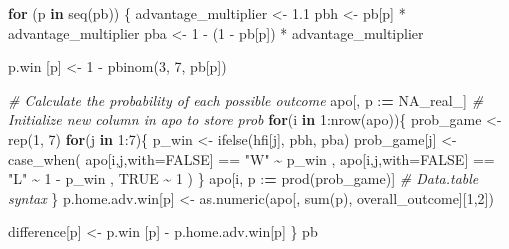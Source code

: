 \documentclass[
]{article}
\newenvironment{Shaded}{\begin{snugshade}}{\end{snugshade}}
\newcommand{\AttributeTok}[1]{\textcolor[rgb]{0.77,0.63,0.00}{#1}}
\newcommand{\CommentTok}[1]{\textcolor[rgb]{0.56,0.35,0.01}{\textit{#1}}}
\newcommand{\ConstantTok}[1]{\textcolor[rgb]{0.00,0.00,0.00}{#1}}
\newcommand{\ControlFlowTok}[1]{\textcolor[rgb]{0.13,0.29,0.53}{\textbf{#1}}}
\newcommand{\DecValTok}[1]{\textcolor[rgb]{0.00,0.00,0.81}{#1}}
\newcommand{\ErrorTok}[1]{\textcolor[rgb]{0.64,0.00,0.00}{\textbf{#1}}}
\newcommand{\FloatTok}[1]{\textcolor[rgb]{0.00,0.00,0.81}{#1}}
\newcommand{\FunctionTok}[1]{\textcolor[rgb]{0.00,0.00,0.00}{#1}}
\newcommand{\NormalTok}[1]{#1}
\newcommand{\OtherTok}[1]{\textcolor[rgb]{0.56,0.35,0.01}{#1}}
\newcommand{\SpecialCharTok}[1]{\textcolor[rgb]{0.00,0.00,0.00}{#1}}
\newcommand{\StringTok}[1]{\textcolor[rgb]{0.31,0.60,0.02}{#1}}
\begin{document}
\begin{Shaded}
\begin{Highlighting}[]
\ControlFlowTok{for}\NormalTok{ (p }\ControlFlowTok{in} \FunctionTok{seq}\NormalTok{(pb)) \{}
\NormalTok{  advantage\_multiplier }\OtherTok{\textless{}{-}} \FloatTok{1.1}
\NormalTok{  pbh }\OtherTok{\textless{}{-}}\NormalTok{ pb[p] }\SpecialCharTok{*}\NormalTok{ advantage\_multiplier}
\NormalTok{  pba }\OtherTok{\textless{}{-}} \DecValTok{1} \SpecialCharTok{{-}}\NormalTok{ (}\DecValTok{1} \SpecialCharTok{{-}}\NormalTok{ pb[p]) }\SpecialCharTok{*}\NormalTok{ advantage\_multiplier}

\NormalTok{  p.win [p] }\OtherTok{\textless{}{-}} \DecValTok{1} \SpecialCharTok{{-}} \FunctionTok{pbinom}\NormalTok{(}\DecValTok{3}\NormalTok{, }\DecValTok{7}\NormalTok{, pb[p])}

  \CommentTok{\# Calculate the probability of each possible outcome}
\NormalTok{  apo[, p }\SpecialCharTok{:}\ErrorTok{=} \ConstantTok{NA\_real\_}\NormalTok{] }\CommentTok{\# Initialize new column in apo to store prob}
  \ControlFlowTok{for}\NormalTok{(i }\ControlFlowTok{in} \DecValTok{1}\SpecialCharTok{:}\FunctionTok{nrow}\NormalTok{(apo))\{}
\NormalTok{    prob\_game }\OtherTok{\textless{}{-}} \FunctionTok{rep}\NormalTok{(}\DecValTok{1}\NormalTok{, }\DecValTok{7}\NormalTok{)}
    \ControlFlowTok{for}\NormalTok{(j }\ControlFlowTok{in} \DecValTok{1}\SpecialCharTok{:}\DecValTok{7}\NormalTok{)\{}
\NormalTok{      p\_win }\OtherTok{\textless{}{-}} \FunctionTok{ifelse}\NormalTok{(hfi[j], pbh, pba)}
\NormalTok{      prob\_game[j] }\OtherTok{\textless{}{-}} \FunctionTok{case\_when}\NormalTok{(}
\NormalTok{          apo[i,j,}\AttributeTok{with=}\ConstantTok{FALSE}\NormalTok{] }\SpecialCharTok{==} \StringTok{"W"} \SpecialCharTok{\textasciitilde{}}\NormalTok{ p\_win}
\NormalTok{        , apo[i,j,}\AttributeTok{with=}\ConstantTok{FALSE}\NormalTok{] }\SpecialCharTok{==} \StringTok{"L"} \SpecialCharTok{\textasciitilde{}} \DecValTok{1} \SpecialCharTok{{-}}\NormalTok{ p\_win}
\NormalTok{        , }\ConstantTok{TRUE} \SpecialCharTok{\textasciitilde{}} \DecValTok{1}
\NormalTok{      )}
\NormalTok{    \}}
\NormalTok{  apo[i, p }\SpecialCharTok{:}\ErrorTok{=} \FunctionTok{prod}\NormalTok{(prob\_game)] }\CommentTok{\# Data.table syntax}
\NormalTok{  \}}
\NormalTok{  p.home.adv.win[p] }\OtherTok{\textless{}{-}} \FunctionTok{as.numeric}\NormalTok{(apo[, }\FunctionTok{sum}\NormalTok{(p), overall\_outcome][}\DecValTok{1}\NormalTok{,}\DecValTok{2}\NormalTok{])}
  
  
  
\NormalTok{  difference[p] }\OtherTok{\textless{}{-}}\NormalTok{ p.win [p] }\SpecialCharTok{{-}}\NormalTok{ p.home.adv.win[p]}
\NormalTok{\}}
\NormalTok{pb}
\end{Highlighting}
\end{Shaded}
\end{document}
